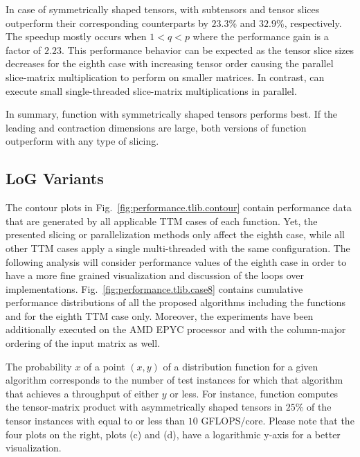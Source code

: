 In case of symmetrically shaped tensors,  with subtensors and tensor slices outperform their corresponding  counterparts by $23.3$\% and $32.9$\%, respectively.
The speedup mostly occurs when $1<q<p$ where the performance gain is a factor of $2.23$.
This performance behavior can be expected as the tensor slice sizes decreases for the eighth case with increasing tensor order causing the parallel slice-matrix multiplication to perform on smaller matrices.
In contrast,  can execute small single-threaded slice-matrix multiplications in parallel.

In summary, function  with symmetrically shaped tensors performs best.
If the leading and contraction dimensions are large, both versions of function  outperform  with any type of slicing. 

\subsection{LoG Variants}
\label{subsec:results.log}
The contour plots in Fig.~\ref{fig:performance.tlib.contour} contain performance data that are generated by all applicable TTM cases of each  function.
Yet, the presented slicing or parallelization methods only affect the eighth case, while all other TTM cases apply a single multi-threaded  with the same configuration.
The following analysis will consider performance values of the eighth case in order to have a more fine grained visualization and discussion of the loops over  implementations.
Fig.~\ref{fig:performance.tlib.case8} contains cumulative performance distributions of all the proposed algorithms including the functions  and  for the eighth TTM case only.
Moreover, the experiments have been additionally executed on the AMD EPYC processor and with the column-major ordering of the input matrix as well.

The probability $x$ of a point $(x,y)$ of a distribution function for a given algorithm corresponds to the number of test instances for which that algorithm that achieves a throughput of either $y$ or less.
For instance, function  computes the tensor-matrix product with asymmetrically shaped tensors in $25$\% of the tensor instances with equal to or less than $10$ GFLOPS/core.
Please note that the four plots on the right, plots (c) and (d), have a logarithmic y-axis for a better visualization.


